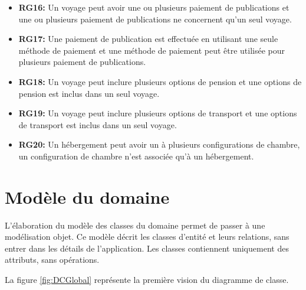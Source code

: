 \documentclass[12pt]{report}
\begin{document}
\begin{itemize}
			    \item \textbf{RG16:} Un voyage peut avoir une ou plusieurs paiement de publications  et une ou plusieurs paiement de publications ne concernent qu'un seul voyage.
			    \item \textbf{RG17:} Une paiement de publication est effectuée en utilisant une seule méthode de paiement et une méthode de paiement peut être utilisée pour plusieurs paiement de publications.
		               \item \textbf{RG18:} Un voyage peut inclure plusieurs options de pension et une options de pension est inclus dans un seul voyage.
		               \item \textbf{RG19:} Un voyage peut inclure plusieurs options de transport et une options de transport est inclus dans un seul voyage.
			    \item \textbf{RG20:} Un hébergement peut avoir un à plusieurs configurations de chambre, un configuration de chambre n'est associée qu'à un hébergement. 

			\end{itemize}



			\section{Modèle du domaine}

			\hspace{15pt} L'élaboration du modèle des classes du domaine permet de passer à une modélisation objet. Ce modèle décrit les classes d'entité et leurs relations, sans entrer dans les détails de l'application. Les classes contiennent uniquement des attributs, sans opérations.


			La figure \ref{fig:DCGlobal} représente la première vision du diagramme de classe.
\end{document}
